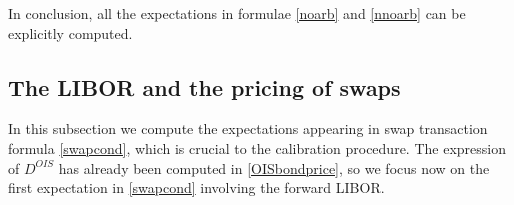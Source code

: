 \documentclass[12pt,a4paper]{article}
\theoremstyle{plain}
\newtheorem{proposition}{Proposition}[section]%
\numberwithin{equation}{section}
\begin{document}
%
In conclusion, all the expectations in formulae  \eqref{noarb} and \eqref{nnoarb} can be explicitly computed.

\subsection{The LIBOR and the pricing of swaps}\label{CIRLIBOR}

In this subsection we compute the expectations appearing in swap transaction formula \eqref{swapcond}, which is crucial to the calibration procedure.
The expression of $D^{OIS}$ has already been computed in \eqref{OISbondprice}, so we focus now on the first expectation in \eqref{swapcond} involving the forward LIBOR.
\end{document}
